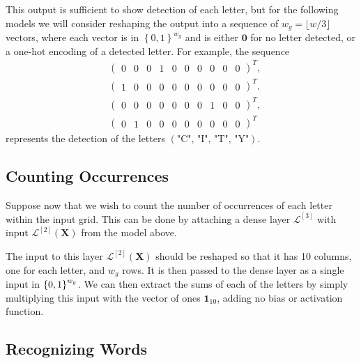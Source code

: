 \documentclass{somasmsc}
\begin{document}
This output is sufficient to show detection of each letter, but for the following models we will consider reshaping the output into a sequence of $w_g = \lfloor w/3 \rfloor$ vectors, where each vector is in $\left\{0,1\right\}^{w_g}$ and is either $\mathbf{0}$ for no letter detected, or a one-hot encoding of a detected letter. For example, the sequence
\begin{align*}
    &\begin{pmatrix}
        0 & 0 & 0 & 1 & 0 & 0 & 0 & 0 & 0 & 0
    \end{pmatrix}^T, \\
    &\begin{pmatrix}
        1 & 0 & 0 & 0 & 0 & 0 & 0 & 0 & 0 & 0
    \end{pmatrix}^T, \\
    &\begin{pmatrix}
        0 & 0 & 0 & 0 & 0 & 0 & 0 & 1 & 0 & 0
    \end{pmatrix}^T, \\
    &\begin{pmatrix}
        0 & 1 & 0 & 0 & 0 & 0 & 0 & 0 & 0 & 0
    \end{pmatrix}^T
\end{align*}
represents the detection of the letters $\left(\text{"C", "I", "T", "Y"}\right)$.

\subsection{Counting Occurrences}\label{letters:count}

Suppose now that we wish to count the number of occurrences of each letter within the input grid. This can be done by attaching a dense layer $\mathcal{L}^{\left[3\right]}$ with input $\mathcal{L}^{\left[2\right]}\left(\mathbf{X}\right)$ from the model above.

The input to this layer $\mathcal{L}^{\left[2\right]}\left(\mathbf{X}\right)$ should be reshaped so that it has 10 columns, one for each letter, and $w_g$ rows. It is then passed to the dense layer as a single input in $\left\{0,1\right\}^{w_g \time 10}$. We can then extract the sums of each of the letters by simply multiplying this input with the vector of ones $\mathbf{1}_{10}$, adding no bias or activation function.

\subsection{Recognizing Words}\label{letters:words}
\end{document}
